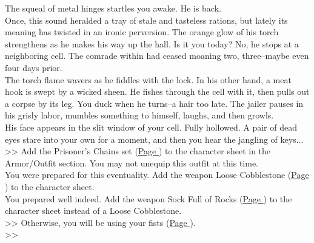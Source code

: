 The squeal of metal hinges startles you awake. He is back.\\

Once, this sound heralded a tray of stale and tasteless rations, but lately its meaning has twisted in an ironic perversion. The orange glow of his torch strengthens as he makes his way up the hall. Is it you today? No, he stops at a neighboring cell. The comrade within had ceased moaning two, three--maybe even four days prior.\\

The torch flame wavers as he fiddles with the lock. In his other hand, a meat hook is swept by a wicked sheen. He fishes through the cell with it, then pulls out a corpse by its leg. You duck when he turns--a hair too late. The jailer pauses in his grisly labor, mumbles something to himself, laughs, and then growls.\\

His face appears in the slit window of your cell. Fully hollowed. A pair of dead eyes stare into your own for a moment, and then you hear the jangling of keys...\\

>> Add the Prisoner’s Chains set (\hyperlink{Prisoner’s Chains}{Page \pageref{Prisoner’s Chains}}) to the character sheet in the Armor/Outfit section. You may not unequip this outfit at this time.\\
 You were prepared for this eventuality. Add the weapon Loose Cobblestone (\hyperlink{Loose Cobblestone}{Page \pageref{Loose Cobblestone}}) to the character sheet.\\
 You prepared well indeed. Add the weapon Sock Full of Rocks (\hyperlink{Sock Full of Rocks}{Page \pageref{Sock Full of Rocks}}) to the character sheet instead of a Loose Cobblestone.\\
>> Otherwise, you will be using your fists (\hyperlink{Fist}{Page \pageref{Fist}}).\\

>>